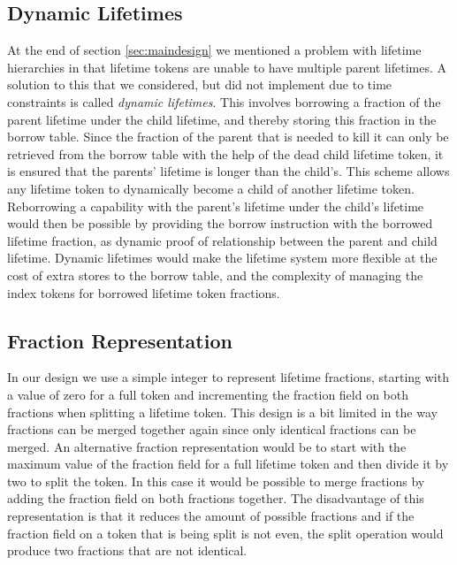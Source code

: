 \subsection{Dynamic Lifetimes}
\label{sec:dynamiclifetimes}
At the end of section \ref{sec:maindesign} we mentioned a problem with lifetime hierarchies in that lifetime tokens are unable to have multiple parent lifetimes.
A solution to this that we considered, but did not implement due to time constraints is called \textit{dynamic lifetimes}.
This involves borrowing a fraction of the parent lifetime under the child lifetime, and thereby storing this fraction in the borrow table.
Since the fraction of the parent that is needed to kill it can only be retrieved from the borrow table with the help of the dead child lifetime token, it is ensured that the parents' lifetime is longer than the child's.
This scheme allows any lifetime token to dynamically become a child of another lifetime token.
Reborrowing a capability with the parent's lifetime under the child's lifetime would then be possible by providing the borrow instruction with the borrowed lifetime fraction, as dynamic proof of relationship between the parent and child lifetime.
Dynamic lifetimes would make the lifetime system more flexible at the cost of extra stores to the borrow table, and the complexity of managing the index tokens for borrowed lifetime token fractions.

\subsection{Fraction Representation}
In our design we use a simple integer to represent lifetime fractions, starting with a value of zero for a full token and incrementing the fraction field on both fractions when splitting a lifetime token.
This design is a bit limited in the way fractions can be merged together again since only identical fractions can be merged.
An alternative fraction representation would be to start with the maximum value of the fraction field for a full lifetime token and then divide it by two to split the token.
In this case it would be possible to merge fractions by adding the fraction field on both fractions together.
The disadvantage of this representation is that it reduces the amount of possible fractions and if the fraction field on a token that is being split is not even, the split operation would produce two fractions that are not identical.

